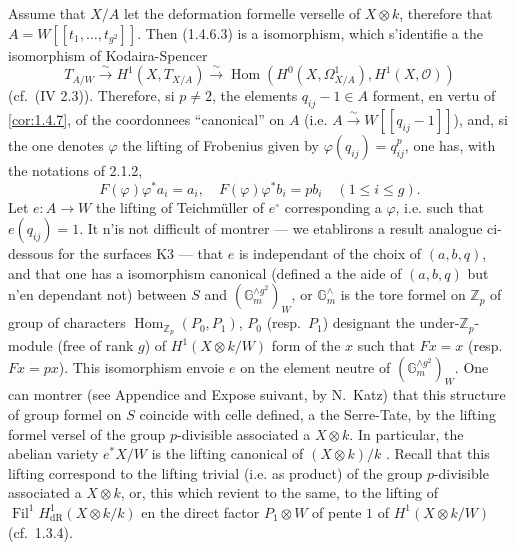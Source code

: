\documentclass[12pt,a4paper]{article}
\theoremstyle{plain}
\theoremstyle{definition}
\theoremstyle{remark}
\DeclareMathOperator{\Fil}{Fil}
\DeclareMathOperator{\Hom}{Hom}
\providecommand{\Hom}{\operatorname{Hom}}
\begin{document}
\subsubsection{}
Assume that $X/A$ let the deformation formelle verselle of $X \otimes k$, therefore that $A = W[[t_1, \ldots, t_{g^2}]]$. Then (1.4.6.3) is a isomorphism, which s'identifie a the isomorphism of Kodaira-Spencer
\[
T_{A/W} \xrightarrow{\sim} H^1(X, T_{X/A}) \xrightarrow{\sim} \Hom(H^0(X, \Omega^1_{X/A}), H^1(X, \mathcal{O}))
\]
(cf.\ (IV 2.3)). Therefore, si $p \neq 2$, the elements $q_{ij} - 1 \in A$ forment, en vertu of \ref{cor:1.4.7}, of the coordonnees ``canonical'' on $A$ (i.e. $A \xrightarrow{\sim} W[[q_{ij} - 1]]$), and, si the one denotes $\varphi$ the lifting of Frobenius given by $\varphi(q_{ij}) = q_{ij}^p$, one has, with the notations of 2.1.2,
\[
F(\varphi)\varphi^*a_i = a_i, \quad F(\varphi)\varphi^*b_i = pb_i \quad (1 \leqslant i \leqslant g).
\]
Let $e : A \to W$ the lifting of Teichm\"uller of $e^\circ$ corresponding a $\varphi$, i.e. such that $e(q_{ij}) = 1$. It n'is not difficult of montrer --- we etablirons a result analogue ci-dessous for the surfaces K3 --- that $e$ is independant of the choix of $(a, b, q)$, and that one has a isomorphism canonical (defined a the aide of $(a, b, q)$ but n'en dependant not) between $S$ and $(\mathbb{G}_m^{\wedge g^2})_W$, or $\mathbb{G}_m^{\wedge}$ is the tore formel on $\mathbb{Z}_p$ of group of characters $\Hom_{\mathbb{Z}_p}(P_0, P_1)$, $P_0$ (resp.\ $P_1$) designant the under-$\mathbb{Z}_p$-module (free of rank $g$) of $H^1(X \otimes k/W)$ form of the $x$ such that $Fx = x$ (resp.\ $Fx = px$). This isomorphism envoie $e$ on the element neutre of $(\mathbb{G}_m^{\wedge g^2})_W$. One can montrer (see Appendice and Expose suivant, by N.~Katz) that this structure of group formel on $S$ coincide with celle defined, a the Serre-Tate, by the lifting formel versel of the group $p$-divisible associated a $X \otimes k$. In particular, the abelian variety $e^*X/W$ is the lifting canonical of $(X \otimes k)/k$ \cite[\S V \S 3]{Messing}. Recall that this lifting correspond to the lifting trivial (i.e. as product) of the group $p$-divisible associated a $X \otimes k$, or, this which revient to the same, to the lifting of $\Fil^1 H^1_\mathrm{dR}(X \otimes k/k)$ en the direct factor $P_1 \otimes W$ of pente $1$ of $H^1(X \otimes k/W)$ (cf.\ 1.3.4).
\end{document}
